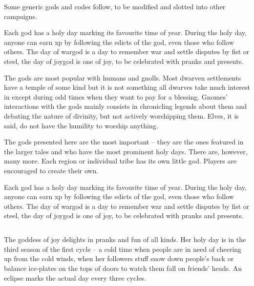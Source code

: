 \begin{multicols}{2}

\noindent
Some generic gods and codes follow, to be modified and slotted into other campaigns.

Each god has a holy day marking its favourite time of year.
During the holy day, anyone can earn \gls{xp} by following the edicts of the god, even those who follow others.
The day of \gls{wargod} is a day to remember war and settle disputes by fist or steel, the day of \gls{joygod} is one of joy, to be celebrated with pranks and presents.

The gods are most popular with humans and gnolls. Most dwarven settlements have a temple of some kind but it is not something all dwarves take much interest in except during odd times when they want to pay for a blessing. Gnomes' interactions with the gods mainly consists in chronicling legends about them and debating the nature of divinity, but not actively worshipping them. Elves, it is said, do not have the humility to worship anything.

The gods presented here are the most important -- they are the ones featured in the larger tales and who have the most prominent holy days. There are, however, many more. Each region or individual tribe has its own little god. Players are encouraged to create their own.

Each god has a holy day marking its favourite time of year.
During the holy day, anyone can earn \gls{xp} by following the edicts of the god, even those who follow others.
The day of \gls{wargod} is a day to remember war and settle disputes by fist or steel, the day of \gls{joygod} is one of joy, to be celebrated with pranks and presents.

\subsection[\Glsentrytext{joygod} -- Goddess of Joy]{}

\noindent The goddess of joy delights in pranks and fun of all kinds. Her holy day is in the third season of the first cycle -- a cold time when people are in need of cheering up from the cold winds, when her followers stuff snow down people's back or balance ice-plates on the tops of doors to watch them fall on friends' heads. An eclipse marks the actual day every three cycles.

\begin{xpchart}{}


\end{xpchart}
\end{multicols}

